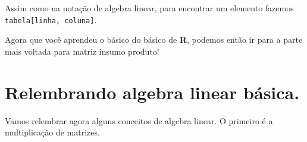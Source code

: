 \documentclass[
]{article}
\begin{document}
Assim como na notação de algebra linear, para encontrar um elemento
fazemos \texttt{tabela{[}linha,\ coluna{]}}.

Agora que você aprendeu o básico do básico de \textbf{R}, podemos então
ir para a parte mais voltada para matriz insumo produto!

\hypertarget{relembrando-algebra-linear-buxe1sica.}{%
\section{Relembrando algebra linear
básica.}\label{relembrando-algebra-linear-buxe1sica.}}

Vamos relembrar agora alguns conceitos de algebra linear. O primeiro é a
multiplicação de matrizes.
\end{document}

